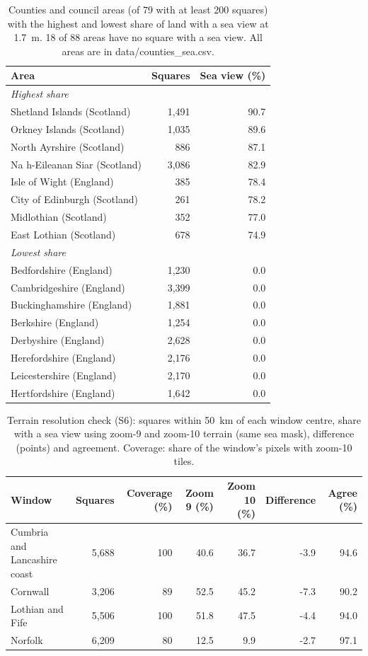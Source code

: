 \documentclass[11pt,a4paper]{article}
\begin{document}
\begin{table}[tbp]\centering\small\caption{Counties and council areas (of 79 with at least 200 squares) with the highest and lowest share of land with a sea view at 1.7~m. 18 of 88 areas have no square with a sea view. All areas are in data/counties\_sea.csv.}\label{tab:counties}\begin{tabular}{lrr}\toprule Area & Squares & Sea view (\%)\\\midrule
\multicolumn{3}{l}{\textit{Highest share}}\\
\quad Shetland Islands (Scotland) & 1,491 & 90.7\\
\quad Orkney Islands (Scotland) & 1,035 & 89.6\\
\quad North Ayrshire (Scotland) & 886 & 87.1\\
\quad Na h-Eileanan Siar (Scotland) & 3,086 & 82.9\\
\quad Isle of Wight (England) & 385 & 78.4\\
\quad City of Edinburgh (Scotland) & 261 & 78.2\\
\quad Midlothian (Scotland) & 352 & 77.0\\
\quad East Lothian (Scotland) & 678 & 74.9\\
\multicolumn{3}{l}{\textit{Lowest share}}\\
\quad Bedfordshire (England) & 1,230 & 0.0\\
\quad Cambridgeshire (England) & 3,399 & 0.0\\
\quad Buckinghamshire (England) & 1,881 & 0.0\\
\quad Berkshire (England) & 1,254 & 0.0\\
\quad Derbyshire (England) & 2,628 & 0.0\\
\quad Herefordshire (England) & 2,176 & 0.0\\
\quad Leicestershire (England) & 2,170 & 0.0\\
\quad Hertfordshire (England) & 1,642 & 0.0\\
\bottomrule\end{tabular}\end{table}
\begin{table}[tbp]\centering\footnotesize\setlength{\tabcolsep}{4pt}\caption{Terrain resolution check (S6): squares within 50~km of each window centre, share with a sea view using zoom-9 and zoom-10 terrain (same sea mask), difference (points) and agreement. Coverage: share of the window's pixels with zoom-10 tiles.}\label{tab:z10}\begin{tabular}{lrrrrrr}\toprule Window & Squares & Coverage (\%) & Zoom 9 (\%) & Zoom 10 (\%) & Difference & Agree (\%)\\\midrule
Cumbria and Lancashire coast & 5,688 & 100 & 40.6 & 36.7 & -3.9 & 94.6\\
Cornwall & 3,206 & 89 & 52.5 & 45.2 & -7.3 & 90.2\\
Lothian and Fife & 5,506 & 100 & 51.8 & 47.5 & -4.4 & 94.0\\
Norfolk & 6,209 & 80 & 12.5 & 9.9 & -2.7 & 97.1\\
\bottomrule\end{tabular}\end{table}
\end{document}

